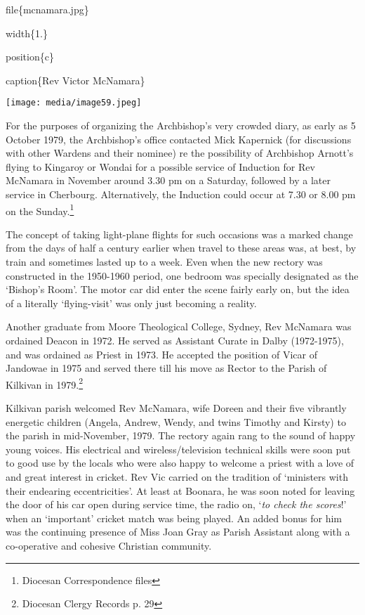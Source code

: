 file\{mcnamara.jpg\}

width\{1.\}

position\{c\}

caption\{Rev Victor McNamara\}

\texttt{[image: media/image59.jpeg]}

For the purposes of organizing the Archbishop's very crowded diary, as early as 5 October 1979, the Archbishop's office contacted Mick Kapernick (for discussions with other Wardens and their nominee) re the possibility of Archbishop Arnott's flying to Kingaroy or Wondai for a possible service of Induction for Rev McNamara in November around 3.30 pm on a Saturday, followed by a later service in Cherbourg. Alternatively, the Induction could occur at 7.30 or 8.00 pm on the Sunday.\footnote{Diocesan Correspondence files}

The concept of taking light-plane flights for such occasions was a marked change from the days of half a century earlier when travel to these areas was, at best, by train and sometimes lasted up to a week. Even when the new rectory was constructed in the 1950-1960 period, one bedroom was specially designated as the `Bishop's Room'. The motor car did enter the scene fairly early on, but the idea of a literally `flying-visit' was only just becoming a reality.

Another graduate from Moore Theological College, Sydney, Rev McNamara was ordained Deacon in 1972. He served as Assistant Curate in Dalby (1972-1975), and was ordained as Priest in 1973. He accepted the position of Vicar of Jandowae in 1975 and served there till his move as Rector to the Parish of Kilkivan in 1979.\footnote{Diocesan Clergy Records p. 29}

Kilkivan parish welcomed Rev McNamara, wife Doreen and their five vibrantly energetic children (Angela, Andrew, Wendy, and twins Timothy and Kirsty) to the parish in mid-November, 1979. The rectory again rang to the sound of happy young voices. His electrical and wireless/television technical skills were soon put to good use by the locals who were also happy to welcome a priest with a love of and great interest in cricket. Rev Vic carried on the tradition of `ministers with their endearing eccentricities'. At least at Boonara, he was soon noted for leaving the door of his car open during service time, the radio on, `\emph{to check the scores}!' when an `important' cricket match was being played. An added bonus for him was the continuing presence of Miss Joan Gray as Parish Assistant along with a co-operative and cohesive Christian community.


